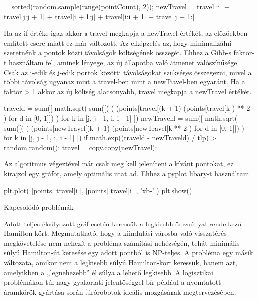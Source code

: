 \begin{python}
[i, j] = sorted(random.sample(range(pointCount), 2));
newTravel = travel[:i] + 
			travel[j:j + 1] + 
			travel[i + 1:j] + 
			travel[i:i + 1] + 
			travel[j + 1:]
\end{python}


Ha az if értéke igaz akkor a travel megkapja a newTravel értékét, az előzöekben említett csere miatt ez már változott. Az elképzelés az, hogy minimalizálni szeretnénk a pontok közti távolságok költségének összegét. Ehhez a Gibb-s faktor-t használtam fel, aminek lényege, az új állapotba való átmenet valószínűsége. Csak az i-edik és j-edik pontok közötti távolságokat szükséges összegezni, mivel a többi távolság ugyanaz mint a travel-ben mint a newTravel-ben egyaránt. Ha a faktor > 1 akkor az új költség alacsonyabb, travel megkapja a newTravel értékét.


\begin{python}
traveld = sum([
	math.sqrt(
		sum([(
			(
			  (points[travel[(k + 1) %
			  (points[travel[k %
			) **  2
		) for d in [0, 1]])
	) for k in [j, j - 1, i, i - 1]
])
newTraveld = sum([
	math.sqrt(
		sum([(
			(
			  (points[newTravel[(k + 1) %
			  (points[newTravel[k %
			** 2
		) for d in [0, 1]])
	) for k in [j, j - 1, i, i - 1]
])
    if math.exp((traveld - newTraveld) / tlp) > random.random():
        travel = copy.copy(newTravel);
\end{python}        


Az algoritmus végeztével már csak meg kell jeleníteni a kívánt pontokat, ez kirajzol egy gráfot, amely optimális utat ad. Ehhez a pyplot libary-t használtam


\begin{python}
plt.plot(
	[points[
		travel[i %
	], 
	[points[
		travel[i %
	], 
	'xb-'
)
plt.show()
\end{python}

Kapcsolódó problémák

Adott teljes élsúlyozott gráf esetén keressük a legkisebb összsúllyal rendelkező Hamilton-kört. Megmutatható, hogy a kiindulási városba való visszatérés megkövetelése nem nehezít a probléma számítási nehézségén, tehát minimális súlyú Hamilton-út keresése egy adott pontból is NP-teljes.
A probléma egy másik változata, amikor nem a legkisebb súlyú Hamilton-kört keressük, hanem azt, amelyikben a „legnehezebb” él súlya a lehető legkisebb. A logisztikai problémákon túl nagy gyakorlati jelentőséggel bír például a nyomtatott áramkörök gyártása során fúrórobotok ideális mozgásának megtervezésében.

